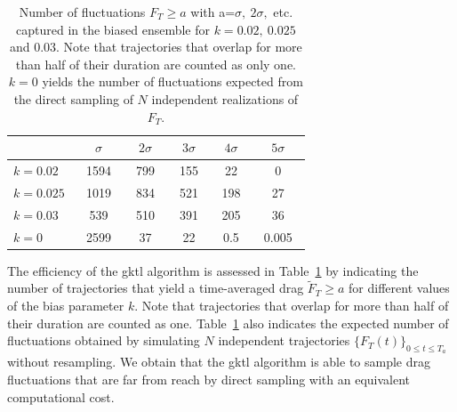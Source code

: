 \documentclass{jfm}
\begin{document}
\begin{table}
	\centering
	\begin{tabular}{|l|c|c|c|c|c|}
		\hline
		& $\sigma$ & $2\sigma$ & $3\sigma$ & $4\sigma$ & $5\sigma$ \\
		\hline
		$k=0.02$ & ~1594~ & ~799~ & ~155~ & 22 & 0  \\ 
		\hline
		$k=0.025~$ & 1019 & 834 & 521 & 198 & 27  \\ 
		\hline
		$k=0.03$ & 539 & 510 & 391 & 205 & 36  \\ 
		\hline
		$k=0$ & 2599 & 37 & 22 & ~0.5~ & ~0.005~ \\
		\hline
	\end{tabular}
	\caption{Number of fluctuations $F_{T} \geq a$ with a=$\sigma,~2\sigma,$ etc. captured in the biased ensemble for $k=0.02,~0.025$ and $0.03$.
		Note that trajectories that overlap for more than half of their duration are counted as only one.
		$k=0$ yields the number of fluctuations expected from the direct sampling of $N$ independent realizations of $F_{T}$.}
	\label{tbl:nbTraj_tbl}
\end{table}

%
The efficiency of the \ac{gktl} algorithm is  assessed in  
Table~\ref{tbl:nbTraj_tbl} by indicating the number of trajectories that yield a time-averaged drag $\tilde{F}_{T} \geq a$ for different values of the bias parameter $k$.
Note that trajectories that overlap for more than half of their duration are counted as one.
Table~\ref{tbl:nbTraj_tbl} also indicates the expected number of fluctuations obtained by simulating $N$ independent trajectories $\{F_T(t)\}_{0\leq t \leq T_a}$ without resampling.
%
%
%
%
We obtain that the \ac{gktl} algorithm is able to sample drag fluctuations that are far from reach by direct sampling with an equivalent computational cost.
\end{document}
